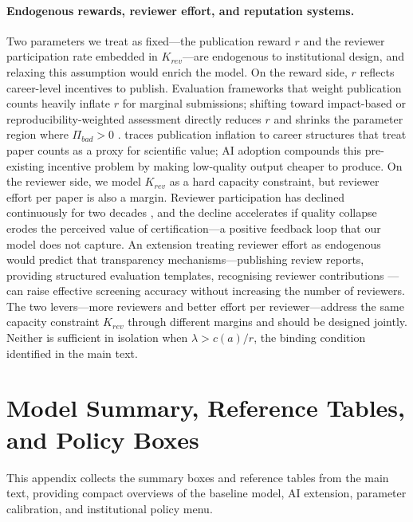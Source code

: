 \documentclass{article}
\begin{document}
\paragraph{Endogenous rewards, reviewer effort, and reputation systems.}
Two parameters we treat as fixed---the publication reward $r$ and the reviewer participation rate embedded in $K_{rev}$---are endogenous to institutional design, and relaxing this assumption would enrich the model.
On the reward side, $r$ reflects career-level incentives to publish.
Evaluation frameworks that weight publication counts heavily inflate $r$ for marginal submissions; shifting toward impact-based or reproducibility-weighted assessment directly reduces $r$ and shrinks the parameter region where $\Pi_{bad} > 0$ \citep{Hicks2015}.
\citet{Stephan2012} traces publication inflation to career structures that treat paper counts as a proxy for scientific value; AI adoption compounds this pre-existing incentive problem by making low-quality output cheaper to produce.
On the reviewer side, we model $K_{rev}$ as a hard capacity constraint, but reviewer effort per paper is also a margin.
Reviewer participation has declined continuously for two decades \citep{Meyerson2025}, and the decline accelerates if quality collapse erodes the perceived value of certification---a positive feedback loop that our model does not capture.
An extension treating reviewer effort as endogenous would predict that transparency mechanisms---publishing review reports, providing structured evaluation templates, recognising reviewer contributions \citep{Aczel2021}---can raise effective screening accuracy without increasing the number of reviewers.
The two levers---more reviewers and better effort per reviewer---address the same capacity constraint $K_{rev}$ through different margins and should be designed jointly.
Neither is sufficient in isolation when $\lambda > c(a)/r$, the binding condition identified in the main text.


\section{Model Summary, Reference Tables, and Policy Boxes}
\label{app:reference}

This appendix collects the summary boxes and reference tables from the main text, providing compact overviews of the baseline model, AI extension, parameter calibration, and institutional policy menu.
\end{document}
